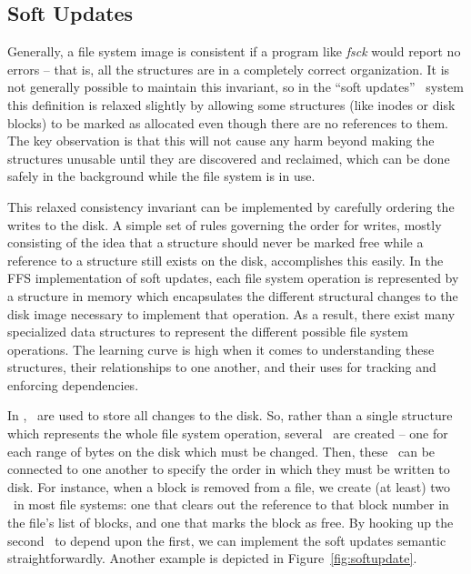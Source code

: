 \subsection {Soft Updates}
\label{sec:consistency:softupdate}

Generally, a file system image is consistent if a program like \emph{fsck}
would report no errors -- that is, all the structures are in a completely
correct organization. It is not generally possible to maintain this invariant,
so in the ``soft updates''~\cite{ganger00soft} system this definition is
relaxed slightly by allowing some structures (like inodes or disk blocks) to be
marked as allocated even though there are no references to them. The key
observation is that this will not cause any harm beyond making the structures
unusable until they are discovered and reclaimed, which can be done safely in
the background while the file system is in use.

This relaxed consistency invariant can be implemented by carefully ordering the
writes to the disk. A simple set of rules governing the order for writes,
mostly consisting of the idea that a structure should never be marked free
while a reference to a structure still exists on the disk, accomplishes this
easily. In the FFS implementation of soft updates, each file system operation
is represented by a structure in memory which encapsulates the different
structural changes to the disk image necessary to implement that operation. As
a result, there exist many specialized data structures to represent the
different possible file system operations. The learning curve is high when it
comes to understanding these structures, their relationships to one another,
and their uses for tracking and enforcing dependencies.

In \Kudos, \chdescs\ are used to store all changes to the disk. So, rather than
a single structure which represents the whole file system operation, several
\chdescs\ are created -- one for each range of bytes on the disk which must be
changed. Then, these \chdescs\ can be connected to one another to specify the
order in which they must be written to disk. For instance, when a block is
removed from a file, we create (at least) two \chdescs\ in most file systems:
one that clears out the reference to that block number in the file's list of
blocks, and one that marks the block as free. By hooking up the second \chdesc\
to depend upon the first, we can implement the soft updates semantic
straightforwardly. Another example is depicted in Figure~\ref{fig:softupdate}.

